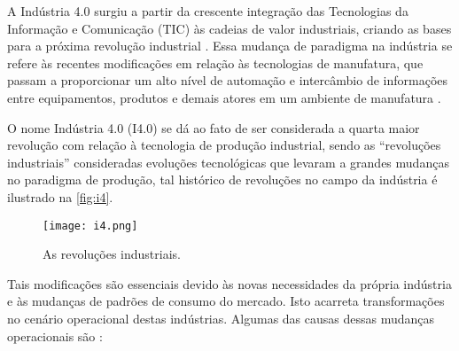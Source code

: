 A Indústria 4.0 surgiu a partir da crescente integração das Tecnologias da Informação e Comunicação (TIC) às cadeias de valor industriais, criando as bases para a próxima revolução industrial \cite{hermann2016design}. Essa mudança de paradigma na indústria se refere às recentes modificações em relação às tecnologias de manufatura, que passam a proporcionar um alto nível de automação e intercâmbio de informações entre equipamentos, produtos e demais atores em um ambiente de manufatura \cite{lasi2014industryfour}.

O nome Indústria 4.0 (I4.0) se dá ao fato de ser considerada a quarta maior revolução com relação à tecnologia de produção industrial, sendo as ``revoluções industriais'' consideradas evoluções tecnológicas que levaram a grandes mudanças no paradigma de produção, tal histórico de revoluções no campo da indústria é ilustrado na \autoref{fig:i4}.

\begin{figure}[htb]
	\centering
	\texttt{[image: i4.png]}
	\caption{As revoluções industriais.}
	\label{fig:i4}
\end{figure}

Tais modificações são essenciais devido às novas necessidades da própria indústria e às mudanças de padrões de consumo do mercado. Isto acarreta transformações no cenário operacional destas indústrias. Algumas das causas dessas mudanças operacionais são \cite{lasi2014industryfour}:

